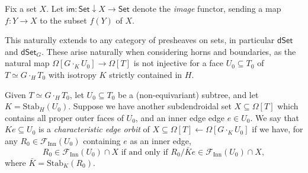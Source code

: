 \documentclass[a4paper,10pt,draft]{article}%
\numberwithin{equation}{section}%
\begin{document}
\begin{definition}
      Fix a set $X$.
      Let $\mathsf{im}: \mathsf{Set} \downarrow X \to \mathsf{Set}$
      denote the \textit{image} functor,
      sending a map $f:Y \to X$ to the subset $f(Y)$ of $X$.
\end{definition}

\begin{remark}
      This naturally extends to any category of presheaves on sets,
      in particular $\mathsf{dSet}$ and $\mathsf{dSet}_G$.
      These arise naturally when considering horns and boundaries, as the natural map
      $\Omega[G \cdot_K U_0] \to \Omega[T]$
      is not injective for a face $U_0 \subseteq T_0$ of $T \simeq G \cdot_H T_0$
      with isotropy $K$ strictly contained in $H$.
\end{remark}



\begin{definition}
      Given $T \simeq G \cdot_H T_0$,
      let $U_0 \subseteq T_0$ be a (non-equivariant) subtree, and
      let $K = \mathrm{Stab}_H(U_0)$.
      Suppose we have another subdendroidal set $X \subseteq \Omega[T]$
      which contains all proper outer faces of $U_0$, and
      an inner edge edge $e \in U_0$.
      We say that $K e \subseteq U_0$ is a \textit{characteristic edge orbit} of
      $X \subseteq \Omega[T] \leftarrow \Omega[G \cdot_K U_0]$
      if we have, for any $R_0 \in \mathscr{F}_{\mathrm{Inn}}(U_0)$ containing $e$ as an inner edge,
      \begin{equation}
            R_0 \in \mathscr{F}_{\mathrm{Inn}}(U_0) \cap X
            \mbox{ if and only if }
            R_0 / \bar K e \in \mathscr{F}_{\mathrm{Inn}}(U_0) \cap X,
      \end{equation}
      where $\bar K = \mathrm{Stab}_{K}(R_0)$. 
\end{definition}
\end{document}
